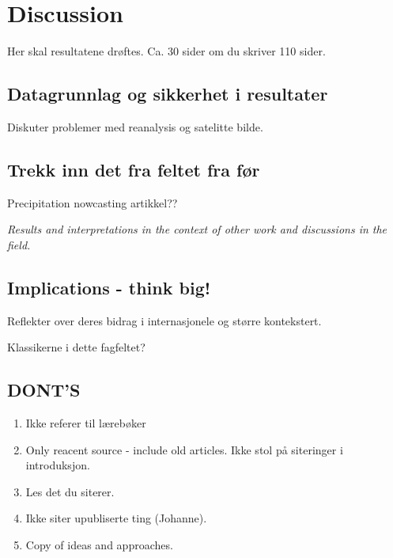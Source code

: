 \chapter{Discussion}

Her skal resultatene drøftes. Ca. 30 sider om du skriver 110 sider. 

\section{Datagrunnlag og sikkerhet i resultater}
Diskuter problemer med reanalysis og satelitte bilde. 

\section{Trekk inn det fra feltet fra før}
Precipitation nowcasting artikkel??

\textit{Results and interpretations in the context of other work and discussions in the field. }

\section{Implications - think big!}
Reflekter over deres bidrag i internasjonele og større kontekstert. 

Klassikerne i dette fagfeltet?

\section{DONT'S}
\begin{enumerate}
    \item Ikke referer til lærebøker 
    \item Only reacent source - include old articles. Ikke stol på siteringer i introduksjon. 
    \item Les det du siterer. 
    \item Ikke siter upubliserte ting (Johanne).
    \item Copy of ideas and approaches.
\end{enumerate}